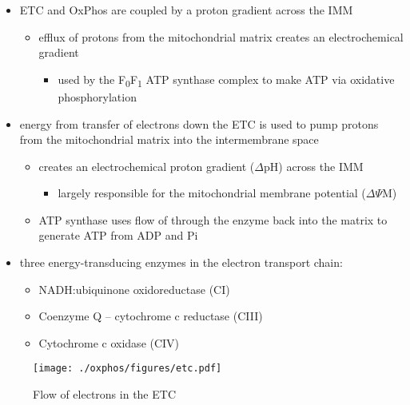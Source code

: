 \documentclass[12pt]{scrartcl}
\begin{document}
\begin{itemize}
\item ETC and OxPhos are coupled by a proton gradient across the IMM
\begin{itemize}
\item efflux of protons from the mitochondrial matrix creates an
electrochemical gradient
\begin{itemize}
\item used by the F\textsubscript{0}F\textsubscript{1} ATP synthase complex to make ATP via oxidative phosphorylation
\end{itemize}
\end{itemize}
\item energy from transfer of electrons down the ETC is used to pump
protons from the mitochondrial matrix into the intermembrane space
\begin{itemize}
\item creates an electrochemical proton gradient (\(\Delta\)pH) across the IMM
\begin{itemize}
\item largely responsible for the mitochondrial membrane potential (\(\Delta \Psi\)M)
\end{itemize}
\item ATP synthase uses flow of  through the enzyme back into the
matrix to generate ATP from ADP and Pi
\end{itemize}
\item three energy-transducing enzymes in the electron transport chain:
\begin{itemize}
\item NADH:ubiquinone oxidoreductase (CI)
\item Coenzyme Q – cytochrome c reductase (CIII)
\item Cytochrome c oxidase (CIV)
\end{itemize}
\end{itemize}


\begin{figure}[htbp]
\centering
\texttt{[image: ./oxphos/figures/etc.pdf]}
\caption{\label{fig:org0d3635e}Flow of electrons in the ETC}
\end{figure}
\end{document}
